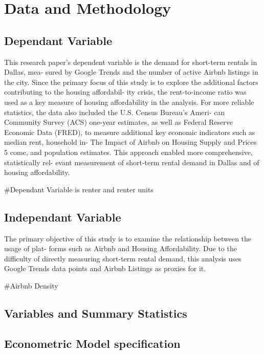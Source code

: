 \documentclass[Department of Economics]{AEA}
\begin{document}
\section{Data and Methodology}\label{data-and-methodology}

\subsection{Dependant Variable}\label{dependant-variable}

This research paper's dependent variable is the demand for short-term
rentals in Dallas, mea- sured by Google Trends and the number of active
Airbnb listings in the city. Since the primary focus of this study is to
explore the additional factors contributing to the housing affordabil-
ity crisis, the rent-to-income ratio was used as a key measure of
housing affordability in the analysis. For more reliable statistics, the
data also included the U.S. Census Bureau's Ameri- can Community Survey
(ACS) one-year estimates, as well as Federal Reserve Economic Data
(FRED), to measure additional key economic indicators such as median
rent, household in- The Impact of Airbnb on Housing Supply and Prices 5
come, and population estimates. This approach enabled more
comprehensive, statistically rel- evant measurement of short-term rental
demand in Dallas and of housing affordability.

\#Dependant Variable is renter and renter units

\subsection{Independant Variable}\label{independant-variable}

The primary objective of this study is to examine the relationship
between the usage of plat- forms such as Airbnb and Housing
Affordability. Due to the difficulty of directly measuring short-term
rental demand, this analysis uses Google Trends data points and Airbnb
Listings as proxies for it.

\#Airbnb Density

\subsection{Variables and Summary
Statistics}\label{variables-and-summary-statistics}

\subsection{Econometric Model
specification}\label{econometric-model-specification}
\end{document}
